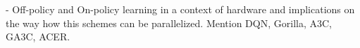 - Off-policy and On-policy learning in a context of hardware and implications
  on the way how this schemes can be parallelized.
  Mention DQN, Gorilla, A3C, GA3C, ACER.

